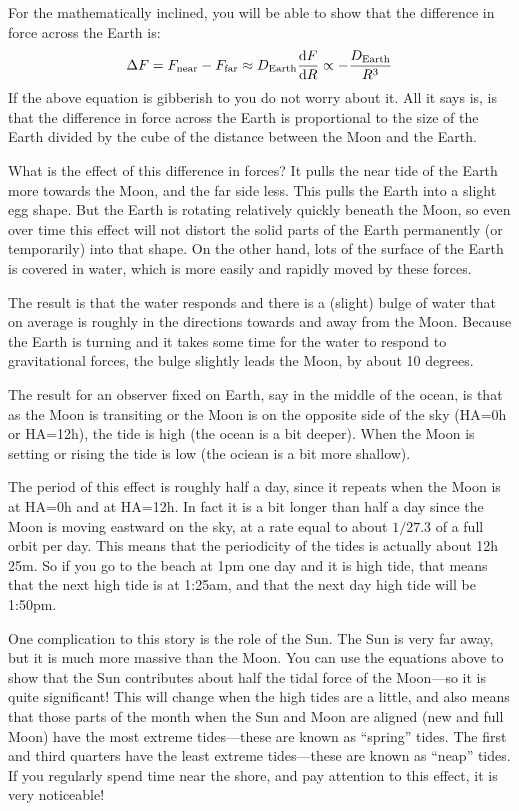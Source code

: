 \documentclass[12pt, preprint]{aastex}
\begin{document}
For the mathematically inclined, you will be able to show that the
difference in force across the Earth is:
\begin{equation}
\Delta F = F_{\rm near} - F_{\rm far} \approx D_{\rm Earth} \frac{{\rm d}
  F}{{\rm d}R} \propto - \frac{D_{\rm Earth} }{R^3}
\end{equation}
If the above equation is gibberish to you do not worry about it. All
it says is, is that the difference in force across the Earth is
proportional to the size of the Earth divided by the cube of the
distance between the Moon and the Earth.

What is the effect of this difference in forces? It pulls the near
tide of the Earth more towards the Moon, and the far side less. This
pulls the Earth into a slight egg shape. But the Earth is rotating
relatively quickly beneath the Moon, so even over time this effect
will not distort the solid parts of the Earth permanently (or
temporarily) into that shape. On the other hand, lots of the surface
of the Earth is covered in water, which is more easily and rapidly
moved by these forces.

The result is that the water responds and there is a (slight) bulge of
water that on average is roughly in the directions towards and away
from the Moon. Because the Earth is turning and it takes some time for
the water to respond to gravitational forces, the bulge slightly leads
the Moon, by about 10 degrees. 

The result for an observer fixed on Earth, say in the middle of the
ocean, is that as the Moon is transiting or the Moon is on the
opposite side of the sky (HA=0h or HA=12h), the tide is high (the
ocean is a bit deeper). When the Moon is setting or rising the tide is
low (the ociean is a bit more shallow).

The period of this effect is roughly half a day, since it repeats when
the Moon is at HA=0h and at HA=12h. In fact it is a bit longer than
half a day since the Moon is moving eastward on the sky, at a rate
equal to about $1/27.3$ of a full orbit per day. This means that the
periodicity of the tides is actually about 12h 25m. So if you go to
the beach at 1pm one day and it is high tide, that means that the next
high tide is at 1:25am, and that the next day high tide will be
1:50pm.

One complication to this story is the role of the Sun. The Sun is very
far away, but it is much more massive than the Moon. You can use the
equations above to show that the Sun contributes about half the tidal
force of the Moon---so it is quite significant! This will change when
the high tides are a little, and also means that those parts of the
month when the Sun and Moon are aligned (new and full Moon) have the
most extreme tides---these are known as ``spring'' tides. The first
and third quarters have the least extreme tides---these are known as
``neap'' tides. If you regularly spend time near the shore, and pay
attention to this effect, it is very noticeable!
\end{document}
